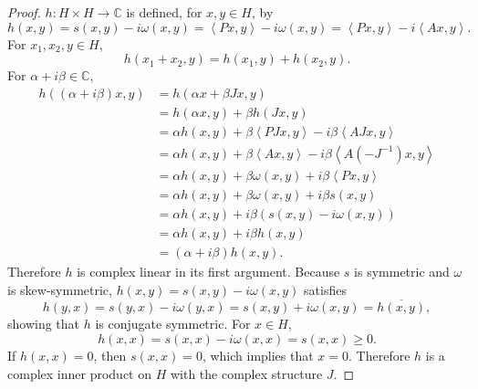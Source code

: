 \documentclass{article}
\newcommand{\inner}[2]{\left\langle #1, #2 \right\rangle}
\theoremstyle{definition}
\theoremstyle{definition}
\begin{document}
\begin{proof}
$h:H \times H \to \mathbb{C}$ is defined, for $x,y \in H$, by
\[
h(x,y) = s(x,y)- i\omega(x,y) = \inner{Px}{y}- i\omega(x,y)
=\inner{Px}{y}-i\inner{Ax}{y}.
\]
For $x_1,x_2, y \in H$,
\[
h(x_1+x_2,y) = h(x_1,y)+h(x_2,y).
\]
For $\alpha+i\beta \in \mathbb{C}$,
\begin{align*}
h((\alpha+i\beta)x,y)&=h(\alpha x+\beta Jx,y)\\
&=h(\alpha x,y)+\beta h(Jx,y)\\
&=\alpha h(x,y) + \beta \inner{PJx}{y}- i\beta \inner{AJx}{y}\\
&=\alpha h(x,y) + \beta \inner{Ax}{y}-i\beta \inner{A(-J^{-1})x}{y}\\
&=\alpha h(x,y) + \beta \omega(x,y) + i\beta \inner{Px}{y}\\
&=\alpha h(x,y) + \beta \omega(x,y) + i\beta s(x,y)\\
&=\alpha h(x,y) + i\beta (s(x,y)-i\omega(x,y))\\
&=\alpha h(x,y) + i\beta h(x,y)\\
&=(\alpha+i\beta) h(x,y).
\end{align*}
Therefore $h$ is complex linear in its first argument. 
Because $s$ is symmetric and $\omega$ is skew-symmetric, $h(x,y) = s(x,y)-i\omega(x,y)$ satisfies
\[
h(y,x) = s(y,x)-i\omega(y,x) = s(x,y) + i \omega(x,y) = \overline{h(x,y)},
\]
showing that $h$ is conjugate symmetric. For $x \in H$,
\[
h(x,x) = s(x,x)-i\omega(x,x) = s(x,x) \geq 0.
\]
If $h(x,x)=0$, then
$s(x,x)=0$, which implies that $x=0$. Therefore $h$ is a complex inner product on $H$ with the complex structure $J$.


\end{proof}
\end{document}
